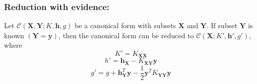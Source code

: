 \documentclass[12pt,oneside,openany,a4paper, %
afrikaans,english,
]{memoir}
\numberwithin{equation}{chapter}
\begin{document}
\subsubsection{Reduction with evidence:}
Let $\mathcal{C}(\bm{X},\bm{Y};K,\bm{h},g)$ be a canonical form with subsets $\bm{X}$ and $\bm{Y}$. If subset $\bm{Y}$ is known $(\bm{Y} =  \bm{y})$, then the canonical form can be reduced to $\mathcal{C}(\bm{X}; K',\bm{h}',g')$, where
\begin{equation}
K' = K_{\bm{XX}}
\end{equation}
\begin{equation}
h' = \bm{h}_{\bm{X}} - K_{\bm{XY}}\bm{y}
\end{equation}
\begin{equation}
g' = g + \bm{h}_{\bm{Y}}^T\bm{y} - \frac{1}{2}\bm{y}^TK_{\bm{YY}}\bm{y}
\end{equation}
\end{document}
